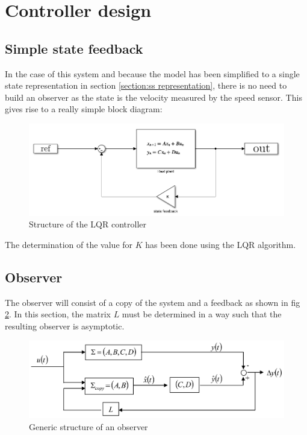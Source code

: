 \section{Controller design}

\subsection{Simple state feedback}

In the case of this system and because the model has been simplified to a single state representation in section
\ref{section:ss representation}, there is no need to build an observer as the state is the velocity measured by the 
speed sensor. This gives rise to a really simple block diagram:

\begin{figure}[H]
    \centering
    \includegraphics[width = \textwidth]{Pictures/lqr_controller.png}
    \caption{Structure of the LQR controller}
    \label{fig:lqr structure}
\end{figure}

The determination of the value for $K$ has been done using the LQR algorithm.

\iffalse
\subsection{Observer}

The observer will consist of a copy of the system and a feedback as shown in fig \ref{fig:observer structure}. In this
section, the matrix $L$ must be determined in a way such that the resulting observer is asymptotic.

\begin{figure}[H]
    \centering
    \includegraphics[height=\textheight/7]{Pictures/observer_general_structure.png}
    \caption{Generic structure of an observer}
    \label{fig:observer structure}
\end{figure}

